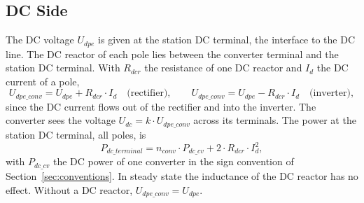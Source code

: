 \subsection{DC Side}
\label{sec:station-dc}

The DC voltage $U_{dpe}$ is given at the station DC terminal, the interface to the DC line. The DC reactor of each
pole lies between the converter terminal and the station DC terminal. With $R_{dcr}$ the resistance of one DC reactor
and $I_d$ the DC current of a pole,
\begin{equation}
  U_{dpe\_conv} = U_{dpe} + R_{dcr} \cdot I_d \quad \text{(rectifier)} , \qquad
  U_{dpe\_conv} = U_{dpe} - R_{dcr} \cdot I_d \quad \text{(inverter)} ,
\end{equation}
since the DC current flows out of the rectifier and into the inverter. The converter sees the voltage
$U_{dc} = k \cdot U_{dpe\_conv}$ across its terminals. The power at the station DC terminal, all poles, is
\begin{equation}
  P_{dc\_terminal} = n_{conv} \cdot P_{dc\_cv} + 2 \cdot R_{dcr} \cdot I_d^2 ,
\end{equation}
with $P_{dc\_cv}$ the DC power of one converter in the sign convention of Section~\ref{sec:conventions}. In steady
state the inductance of the DC reactor has no effect. Without a DC reactor, $U_{dpe\_conv} = U_{dpe}$.
